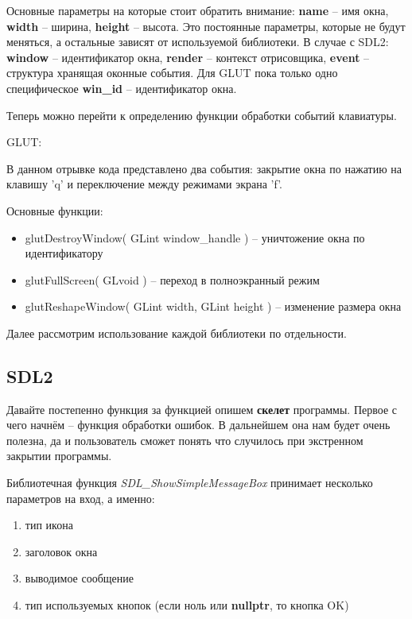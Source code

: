 Основные параметры на которые стоит обратить внимание: \textbf{name} -- имя окна, \textbf{width} -- ширина, 
\textbf{height} -- высота. Это постоянные параметры, которые не будут меняться, а остальные зависят от 
используемой библиотеки. В случае с SDL2: \textbf{window} -- идентификатор окна, \textbf{render} -- контекст 
отрисовщика, \textbf{event} -- структура хранящая оконные события. Для GLUT пока только одно специфическое 
\textbf{win\_id} -- идентификатор окна.

Теперь можно перейти к определению функции обработки событий клавиатуры.

GLUT:


В данном отрывке кода представлено два события: закрытие окна по нажатию на клавишу 'q' и переключение между 
режимами экрана 'f'.

Основные функции:
\begin{itemize}\itemsep-5pt
    \item glutDestroyWindow( GLint window\_handle ) -- уничтожение окна по идентификатору
    \item glutFullScreen( GLvoid ) -- переход в полноэкранный режим
    \item glutReshapeWindow( GLint width, GLint height ) -- изменение размера окна
\end{itemize}

Далее рассмотрим использование каждой библиотеки по отдельности.

\pagebreak

\subsection{SDL2}
Давайте постепенно функция за функцией опишем \textbf{скелет} программы. Первое с чего начнём -- функция 
обработки ошибок. В дальнейшем она нам будет очень полезна, да и пользователь сможет понять что случилось при 
экстренном закрытии программы.



Библиотечная функция \emph{SDL\_ShowSimpleMessageBox} принимает несколько параметров на вход, а именно:
\begin{enumerate}\itemsep-5pt
    \item тип икона
    \item заголовок окна
    \item выводимое сообщение
    \item тип используемых кнопок (если ноль или \textbf{nullptr}, то кнопка OK)
\end{enumerate}

